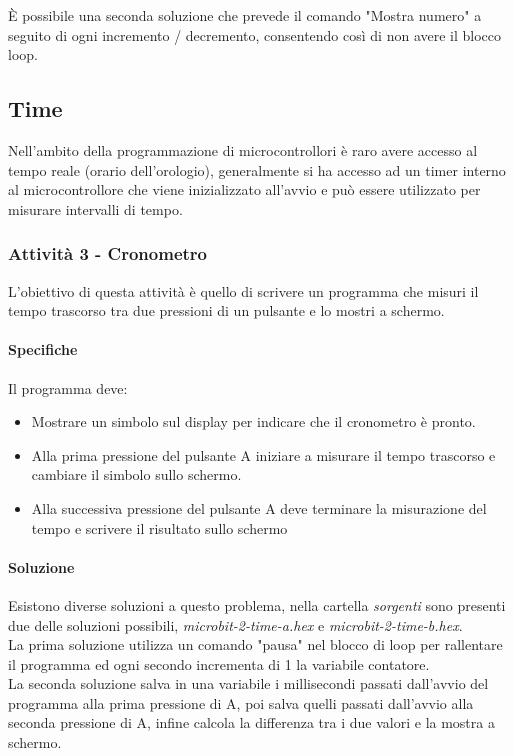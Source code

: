 \documentclass[../../docenti.tex]{subfiles}
\begin{document}
È possibile una seconda soluzione che prevede il comando "Mostra numero" a seguito di ogni incremento / decremento, consentendo così di non avere il blocco loop.
\newpage
\subsection{Time}
Nell'ambito della programmazione di microcontrollori è raro avere accesso al tempo reale (orario dell'orologio), generalmente si ha accesso ad un timer interno al microcontrollore che viene inizializzato all'avvio e può essere utilizzato per misurare intervalli di tempo.

\subsubsection{Attività 3 - Cronometro}
L'obiettivo di questa attività è quello di scrivere un programma che misuri il tempo trascorso tra due pressioni di un pulsante e lo mostri a schermo.

\paragraph{Specifiche} Il programma deve:
\begin{itemize}
	\item Mostrare un simbolo sul display per indicare che il cronometro è pronto.
	\item Alla prima pressione del pulsante A iniziare a misurare il tempo trascorso e cambiare il simbolo sullo schermo.
	\item Alla successiva pressione del pulsante A deve terminare la misurazione del tempo e scrivere il risultato sullo schermo
\end{itemize}

\paragraph{Soluzione}
Esistono diverse soluzioni a questo problema, nella cartella \textit{sorgenti} sono presenti due delle soluzioni possibili,  \textit{microbit-2-time-a.hex} e \textit{microbit-2-time-b.hex}.\\
La prima soluzione utilizza un comando "pausa" nel blocco di loop per rallentare il programma ed ogni secondo incrementa di 1 la variabile contatore.\\
La seconda soluzione salva in una variabile i millisecondi passati dall'avvio del programma alla prima pressione di A, poi salva quelli passati dall'avvio alla seconda pressione di A, infine calcola la differenza tra i due valori e la mostra a schermo.
\end{document}
